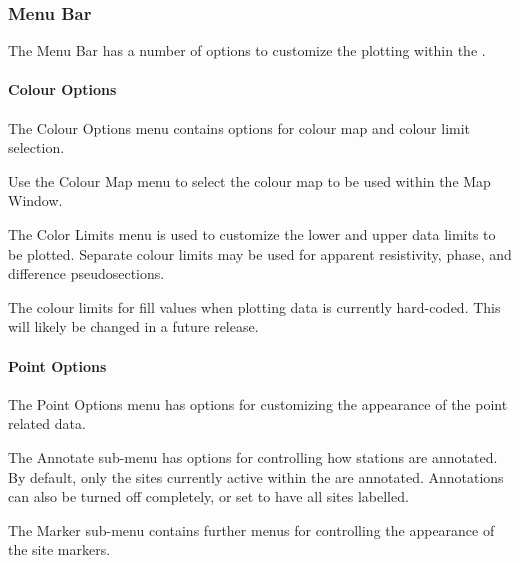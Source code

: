 \documentclass[letterpaper,10pt,english]{sphinxmanual}
\begin{document}
\subsubsection{Menu Bar}
\label{\detokenize{content/data_plot/map_viewer:menu-bar}}
\begin{figure}[htbp]
\centering

\noindent{}
\end{figure}

The Menu Bar has a number of options to customize the plotting within the {\hyperref[\detokenize{content/data_plot/map_viewer:map-window}]{}}.


\paragraph{Colour Options}
\label{\detokenize{content/data_plot/map_viewer:colour-options}}
The Colour Options menu contains options for colour map and colour limit selection.

Use the Colour Map menu to select the colour map to be used within the Map Window.

The Color Limits menu is used to customize the lower and upper data limits to be plotted. Separate colour limits may be used for apparent resistivity, phase, and difference pseudosections.

The colour limits for fill values when plotting {\hyperref[\detokenize{content/data_plot/map_viewer:phase-tensor}]{}} data is currently hard-coded. This will likely be changed in a future release.


\paragraph{Point Options}
\label{\detokenize{content/data_plot/map_viewer:point-options}}
The Point Options menu has options for customizing the appearance of the point related data.

The Annotate sub-menu has options for controlling how stations are annotated.
By default, only the sites currently active within the {\hyperref[\detokenize{content/data_plot/main_window:plot-window}]{}} are annotated.
Annotations can also be turned off completely, or set to have all sites labelled.

The Marker sub-menu contains further menus for controlling the appearance of the site markers.
\end{document}
